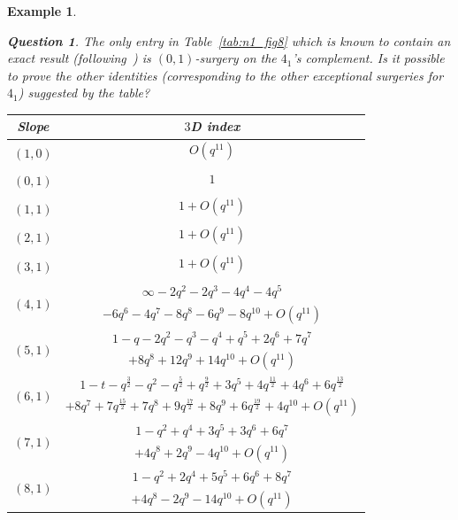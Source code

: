 \documentclass[11pt]{amsart}
\newtheorem{example}[thm]{Example}
\newtheorem{ques}[thm]{Question}
\begin{document}
\begin{example}
\begin{ques}
The only entry in Table~\ref{tab:n1_fig8} which is known to contain an exact result (following~\cite[Thm.~13.2]{3dindexdehn}) is $(0,1)$-surgery on the $4_1$'s complement. Is it possible to prove the other identities (corresponding to the other exceptional surgeries for $4_1$) suggested by the table?
\end{ques}
\begin{table}
\begin{tabular}{|c|c|}
\hline
Slope & $3$D index\\
\hline
\multirow{2}{*}{$\left(1,0\right)$} & $ O\left(q^{11}\right)$ \\
 & \\
\hline
\multirow{2}{*}{$\left(0,1\right)$} & $1$ \\
 & \\
\hline
\multirow{2}{*}{$\left(1,1\right)$} & $1 + O\left(q^{11}\right)$ \\
 & \\
\hline
\multirow{2}{*}{$\left(2,1\right)$} & $1 + O\left(q^{11}\right)$ \\
 & \\
\hline
\multirow{2}{*}{$\left(3,1\right)$} & $1 + O\left(q^{11}\right)$ \\
 & \\
\hline
\multirow{2}{*}{$\left(4,1\right)$} & $\infty - 2q^2 - 2q^3 - 4q^4 - 4q^5  $ \\
 & $- 6q^6 - 4q^7 - 8q^8 - 6q^9 - 8q^{10} + O\left(q^{11}\right)$ \\
\hline
\multirow{2}{*}{$\left(5,1\right)$} & $1 - q - 2 q^2 - q^3 - q^4 + q^5 + 2 q^6 + 7 q^7$ \\
 & $+ 8 q^8 + 12 q^9 + 14 q^{10} + O\left(q^{11}\right)$ \\
\hline
\multirow{2}{*}{$\left(6,1\right)$} & $1 - t - q^{\frac32} - q^2 - q^\frac52 + q^\frac92 + 3 q^5 + 4 q^{\frac{11}{2}} + 4 q^6+ 6 q^{\frac{13}{2}}$ \\
 & $ + 8 q^7 + 7 q^\frac{15}2 + 7 q^8 + 9 q^\frac{17}2 + 8 q^9 + 6 q^\frac{19}2 + 4 q^{10} + O\left(q^{11}\right)$ \\
\hline
\multirow{2}{*}{$\left(7,1\right)$} & $1 - q^2 + q^4 + 3 q^5 + 3 q^6 + 6 q^7$ \\
 & $+ 4 q^8 + 2 q^9 - 4 q^{10} + O\left(q^{11}\right)$ \\
\hline
\multirow{2}{*}{$\left(8,1\right)$} & $1 - q^2 + 2 q^4 + 5 q^5 + 6 q^6 + 8 q^7$ \\
 & $+ 4 q^8 - 2 q^9 - 14 q^{10} + O\left(q^{11}\right)$ \\

\end{tabular}
\end{table}
\end{example}
\end{document}
